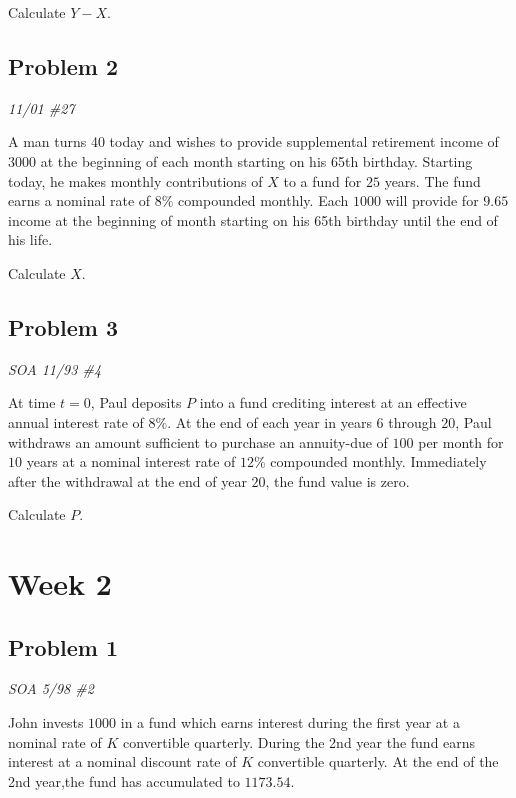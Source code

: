 \documentclass[
]{book}
\begin{document}
Calculate \(Y-X\).

\hypertarget{problem-2}{%
\subsection*{Problem 2}\label{problem-2}}

\emph{11/01 \#27}

A man turns 40 today and wishes to provide supplemental retirement income of \(3000\) at the beginning of each month starting on his 65th birthday. Starting today, he makes monthly contributions of \(X\) to a fund for \(25\) years. The fund earns a nominal rate of \(8\%\) compounded monthly. Each \(1000\) will provide for \(9.65\) income at the beginning of month starting on his 65th birthday until the end of his life.

Calculate \(X\).

\hypertarget{problem-3}{%
\subsection*{Problem 3}\label{problem-3}}

\emph{SOA 11/93 \#4}

At time \(t=0\), Paul deposits \(P\) into a fund crediting interest at an effective annual interest rate of \(8\%\). At the end of each year in years \(6\) through \(20\), Paul withdraws an amount sufficient to purchase an annuity-due of \(100\) per month for \(10\) years at a nominal interest rate of \(12\%\) compounded monthly. Immediately after the withdrawal at the end of year \(20\), the fund value is zero.

Calculate \(P\).

\hypertarget{week-2}{%
\section*{Week 2}\label{week-2}}

\hypertarget{problem-1-1}{%
\subsection*{Problem 1}\label{problem-1-1}}

\emph{SOA 5/98 \#2}

John invests \(1000\) in a fund which earns interest during the first year at a nominal rate of \(K\) convertible quarterly. During the 2nd year the fund earns interest at a nominal discount rate of \(K\) convertible quarterly. At the end of the 2nd year,the fund has accumulated to \(1173.54\).
\end{document}
